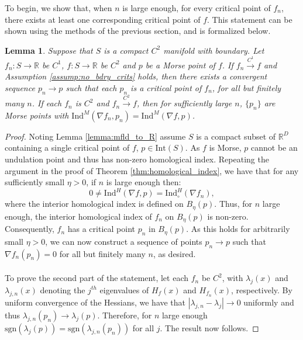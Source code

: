 \documentclass[11pt]{article}
\newcommand{\1}{\mathbf{1}}
\newtheorem{lemma}{Lemma}%
\theoremstyle{definition}
\theoremstyle{remark}
\begin{document}
To begin, we show that, when $n$ is large enough, for every critical point of $f_n$, there exists at least one corresponding critical point of $f$. This statement can be shown using the methods of the previous section, and is formalized below.

\begin{mdframed}
    \begin{lemma}\label{lemma:seq}
        Suppose that $S$ is a compact $C^2$ manifold with boundary. Let $f_n:S\rightarrow \mathbb{R}$ be $C^1$, $f:S\rightarrow \mathbb{R}$ be $C^2$ and $p$ be a Morse point of $f$. If $f_n\xrightarrow{C^1}f$  and Assumption \ref{assump:no_bdry_crits} holds, then there exists a convergent sequence $p_n\rightarrow p$ such that each $p_n$ is a critical point of $f_n$, for all but finitely many $n$. If each $f_n$ is $C^2$ and $f_n\xrightarrow{C^2}f$, then for sufficiently large $n$, $\{p_n\}$ are Morse points with $\text{Ind}^M(\nabla f_n, p_n)= \text{Ind}^M(\nabla f, p)$. 
    \end{lemma}
    \vspace{0.2cm}
\end{mdframed}
\begin{proof}
    Noting Lemma \ref{lemma:mfld_to_R} assume $S$ is a compact subset of $\mathbb{R}^D$ containing a single critical point of $f$, $p\in \text{Int}(S)$. As $f$ is Morse, $p$ cannot be an undulation point and thus has non-zero homological index. Repeating the argument in the proof of Theorem  \ref{thm:homological_index}, we have that for any sufficiently small $\eta >0$, if $n$ is large enough then:
    \begin{equation}\nonumber
        0 \neq \text{Ind}^H(\nabla f, p) = \text{Ind}_\circ^H(\nabla f_n),
    \end{equation}
    where the interior homological index is defined on $B_\eta(p)$. Thus, for $n$ large enough, the interior homological index of $f_n$ on $B_\eta(p)$ is non-zero. Consequently, $f_n$ has a critical point $p_n$ in $B_\eta(p)$. As this holds for arbitrarily small $\eta>0$, we can now construct a sequence of points $p_n\rightarrow p$ such that $\nabla f_n(p_n)=0$ for all but finitely many $n$, as desired. \\
    \\
    To prove the second part of the statement, let each $f_n$ be $C^2$, with $\lambda_j(x)$ and $\lambda_{j,n}(x)$ denoting the $j^{th}$ eigenvalues of $H_f(x)$ and $H_{f_n}(x)$, respectively. By uniform convergence of the Hessians, we have that $|\lambda_{j,n}-\lambda_j|\rightarrow 0$ uniformly and thus $\lambda_{j,n}(p_n)\rightarrow \lambda_j(p)$. Therefore, for $n$ large enough $\text{sgn}(\lambda_{j}(p))=\text{sgn}(\lambda_{j,n}(p_n))$ for all $j$. The result now follows.
\end{proof}
\end{document}
